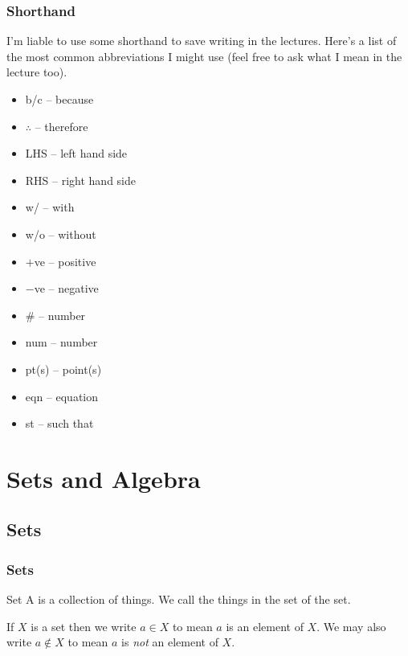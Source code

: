 \documentclass[fleqn]{LectureClass/LectureClass}
\begin{document}
    \section{Shorthand}
    I'm liable to use some shorthand to save writing in the lectures.
    Here's a list of the most common abbreviations I might use (feel free to ask what I mean in the lecture too).
    \begin{multicols}{2}
        \begin{itemize}
            \item b/c -- because
            \item \(\therefore\) -- therefore
            \item LHS -- left hand side
            \item RHS -- right hand side
            \item w/ -- with
            \item w/o -- without
            \item \(+\)ve -- positive
            \item \(-\)ve -- negative
            \item \# -- number
            \item num -- number
            \item pt(s) -- point(s)
            \item eqn -- equation
            \item st -- such that
        \end{itemize}
    \end{multicols}
    
    \part{Sets and Algebra}
    \chapter{Sets}
    \section{Sets}
    \begin{dfn}{Set}{}
        A  is a collection of things.
        We call the things in the set  of the set.
    \end{dfn}
    
    \begin{ntn}{}{}
        If \(X\) is a set then we write \(a \in X\) to mean \(a\) is an element of \(X\).
        We may also write \(a \notin X\) to mean \(a\) is \emph{not} an element of \(X\).
    \end{ntn}
    
\end{document}
